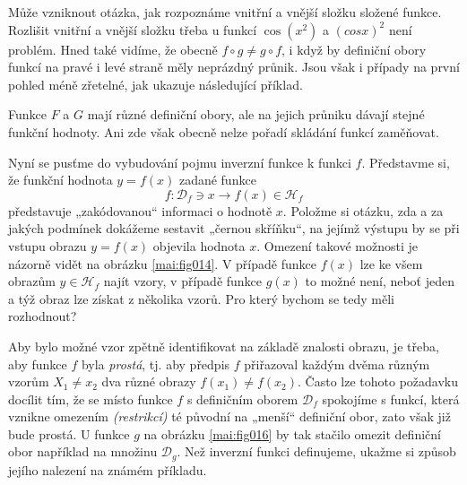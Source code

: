       Může vzniknout otázka, jak rozpoznáme vnitřní a vnější složku složené funkce. Rozlišit 
      vnitřní a vnější složku třeba u funkcí \(\cos(x^2)\) a \((cos x)^2\) není problém. Hned také 
      vidíme, že obecně \(f\circ g\neq g\circ f\), i když by definiční obory funkcí na pravé i levé 
      straně měly neprázdný průnik. Jsou však i případy na první pohled méně zřetelné, jak ukazuje 
      následující příklad.
      
        
       
      Funkce \(F\) a \(G\) mají různé definiční obory, ale na jejich průniku dávají stejné funkční 
      hodnoty. Ani zde však obecně nelze pořadí skládání funkcí zaměňovat.
      
      Nyní se pusťme do vybudování pojmu inverzní funkce k funkci \(f\). Představme si, že funkční
      hodnota \(y = f(x)\) zadané funkce
      \begin{equation*}
        f: \mathcal{D}_f\ni x \rightarrow f(x)\in\mathcal{H}_f
      \end{equation*}
      představuje „zakódovanou“ informaci o hodnotě \(x\). Položme si otázku, zda a za jakých 
      podmínek dokážeme sestavit „černou skříňku“, na jejímž výstupu by se při vstupu obrazu \(y = 
      f(x)\) objevila hodnota \(x\). Omezení takové možnosti je názorně vidět na obrázku 
      \ref{mai:fig014}. V případě funkce \(f(x)\) lze ke všem obrazům \(y \in \mathcal{H}_f\) najít 
      vzory, v případě funkce \(g(x)\) to možné není, neboť jeden a týž obraz lze získat z několika 
      vzorů. Pro který bychom se tedy měli rozhodnout?
      

       Aby bylo možné vzor zpětně identifikovat na základě znalosti obrazu, je třeba, aby funkce 
       \(f\) byla \emph{prostá}, tj. aby předpis \(f\) přiřazoval každým dvěma různým vzorům \(X_1 
       \neq x_2\) dva různé obrazy \(f(x_1) \neq f(x_2)\). Často lze tohoto požadavku docílit tím, 
       že se místo funkce \(f\) s definičním oborem \(\mathcal{D}_f\) spokojíme s funkcí, která 
       vznikne omezením \emph{(restrikcí)} té původní na „menší“ definiční obor, zato však již bude 
       prostá. U funkce \(g\) na obrázku \ref{mai:fig016} by tak stačilo omezit definiční obor 
       například na množinu \(\mathcal{D}_g\). Než inverzní funkci definujeme, ukažme si způsob 
       jejího nalezení na známém příkladu.

